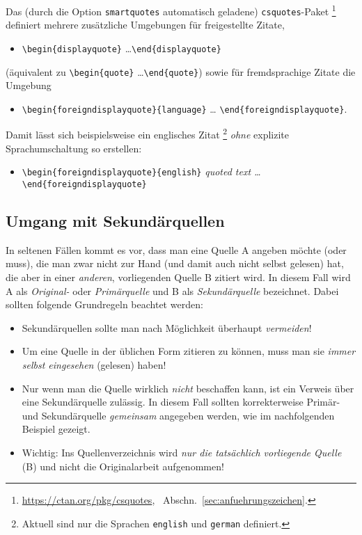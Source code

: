 Das (durch die Option \texttt{smartquotes} automatisch geladene)
\texttt{csquotes}-Paket%
\footnote{\url{https://ctan.org/pkg/csquotes}, \sa\ Abschn.\
\ref{sec:anfuehrungszeichen}.}
definiert mehrere zusätzliche Umgebungen für freigestellte Zitate, \zB\
%
\begin{itemize}
    \item[] \verb!\begin{displayquote}! \ldots \verb!\end{displayquote}!
\end{itemize}
%
(äquivalent zu \verb!\begin{quote}! \ldots \verb!\end{quote}!) sowie für
fremdsprachige Zitate die Umgebung
%
\begin{itemize}
    \item[] \verb!\begin{foreigndisplayquote}{language}! \ldots
    \verb!\end{foreigndisplayquote}!.
\end{itemize}
%
Damit lässt sich beispielsweise ein englisches Zitat%
\footnote{Aktuell sind nur die Sprachen \texttt{english} und \texttt{german}
definiert.}
\emph{ohne} explizite Sprachumschaltung so erstellen:
%
\begin{itemize}
    \item[] \verb!\begin{foreigndisplayquote}{english}!\newline
    \emph{quoted text \ldots}\newline
    \verb!\end{foreigndisplayquote}!
\end{itemize}

\subsection{Umgang mit Sekundärquellen}

In seltenen Fällen kommt es vor, dass man eine Quelle \textrm{A} angeben
möchte (oder muss), die man zwar nicht zur Hand (und damit auch nicht selbst
gelesen) hat, die aber in einer \emph{anderen}, vorliegenden Quelle
\textrm{B} zitiert wird. In diesem Fall wird \textrm{A} als \emph{Original-}
oder \emph{Primärquelle} und \textrm{B} als \emph{Sekundärquelle} bezeichnet.
Dabei sollten folgende Grundregeln beachtet werden:
%
\begin{itemize}
    \item
    Sekundärquellen sollte man nach Möglichkeit überhaupt \emph{vermeiden}!
    \item
    Um eine Quelle in der üblichen Form zitieren zu können, muss man sie
    \emph{immer selbst eingesehen} (gelesen) haben!
    \item
    Nur wenn man die Quelle wirklich \emph{nicht} beschaffen kann, ist ein
    Verweis über eine Sekundärquelle zulässig. In diesem Fall sollten
    korrekterweise Pri\-mär- und Sekundärquelle \emph{gemeinsam} angegeben
    werden, wie im nachfolgenden Beispiel gezeigt.
    \item
    Wichtig: Ins Quellenverzeichnis wird \emph{nur die tatsächlich
    vorliegende Quelle} (\textrm{B}) und nicht die Originalarbeit aufgenommen!
\end{itemize}
%
